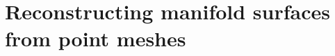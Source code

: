 \section{Reconstructing manifold surfaces from point meshes}
\label{sec:reconstructing_manifold_surfaces_from_point_meshes}


